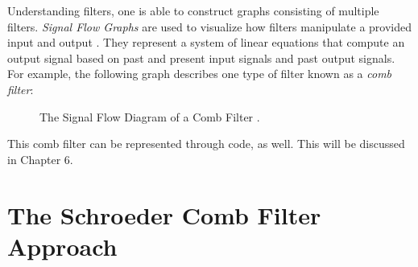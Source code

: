 Understanding filters, one is able to construct graphs consisting of multiple filters. \textit{Signal Flow Graphs} are used to visualize how filters manipulate a provided input and output \cite{FILTERS07}. They represent a system of linear equations that compute an output signal based on past and present input signals and past output signals. For example, the following graph describes one type of filter known as a \textit{comb filter}:

\begin{figure}[h] %
	\begin{center}
		\caption{The Signal Flow Diagram of a Comb Filter \cite{schroeder1961colorless}.}
	\end{center}
\end{figure}


This comb filter can be represented through code, as well. This will be discussed in Chapter 6.

\section{The Schroeder Comb Filter Approach}



